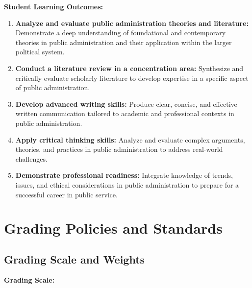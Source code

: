 \documentclass[12pt]{article}     %
\begin{document}
\vspace{1em}
\noindent \textbf{Student Learning Outcomes:}
                   \begin{enumerate}
                        \item \textbf{Analyze and evaluate public administration theories and literature:} Demonstrate a deep understanding of foundational and contemporary theories in public administration and their application within the larger political system.
                        \item \textbf{Conduct a literature review in a concentration area:} Synthesize and critically evaluate scholarly literature to develop expertise in a specific aspect of public administration.
                        \item \textbf{Develop advanced writing skills:} Produce clear, concise, and effective written communication tailored to academic and professional contexts in public administration.
                        \item \textbf{Apply critical thinking skills:} Analyze and evaluate complex arguments, theories, and practices in public administration to address real-world challenges.
                        \item \textbf{Demonstrate professional readiness:} Integrate knowledge of trends, issues, and ethical considerations in public administration to prepare for a successful career in public service.
                  \end{enumerate}

\section{Grading Policies and Standards}

\subsection*{Grading Scale and Weights}

\noindent \textbf{Grading Scale:}
\end{document}
